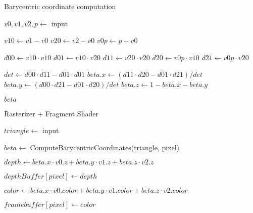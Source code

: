 \begin{algorithm}[H]
\caption{Barycentric coordinate computation}
\begin{algorithmic}
\State $v0, v1, v2, p \gets$ input

\State
\State $v10 \gets v1 - v0$
\State $v20 \gets v2 - v0$
\State $v0p \gets p - v0$

\State
\State $d00 \gets v10 \cdot v10$
\State $d01 \gets v10 \cdot v20$
\State $d11 \gets v20 \cdot v20$
\State $d20 \gets v0p \cdot v10$
\State $d21 \gets v0p \cdot v20$

\State
\State $det \gets d00 \cdot d11 - d01 \cdot d01$
\State $beta.x \gets (d11 \cdot d20 - d01 \cdot d21) / det$
\State $beta.y \gets (d00 \cdot d21 - d01 \cdot d20) / det$
\State $beta.z \gets 1 - beta.x - beta.y$

\State
\State
\Return $beta$
\end {algorithmic}
\end{algorithm}

\begin{algorithm}[H]
\caption{Rasterizer + Fragment Shader}
\begin{algorithmic}
\State $triangle \gets$ input

    \State $beta \gets$ ComputeBarycentricCoordinates(triangle, pixel)

    \State
        \State $depth \gets beta.x \cdot v0.z + beta.y \cdot v1.z + beta.z \cdot v2.z$

        \State
            \State $depthBuffer[pixel] \gets depth$

            \State $color \gets beta.x \cdot v0.color + beta.y \cdot v1.color + beta.z \cdot v2.color$

            \State $framebuffer[pixel] \gets color$
        \EndIf
    \EndIf
\end{algorithmic}
\end{algorithm}
